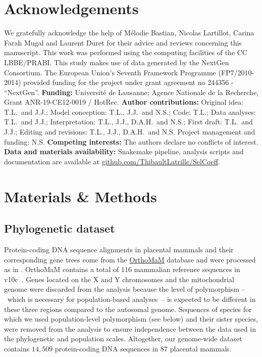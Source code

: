 \documentclass{article}
\begin{document}
    \section*{Acknowledgements}
    \label{sec:acknowledgment}
    We gratefully acknowledge the help of Mélodie Bastian, Nicolas Lartillot, Carina Farah Mugal and Laurent Duret for their advice and reviews concerning this manuscript.
    This work was performed using the computing facilities of the CC LBBE/PRABI\@.
    This study makes use of data generated by the NextGen Consortium.
    The European Union’s Seventh Framework Programme (FP7/2010-2014) provided funding for the project under grant agreement no 244356 - “NextGen”.
    \textbf{Funding:}
    Université de Lausanne; Agence Nationale de la Recherche, Grant ANR-19-CE12-0019 / HotRec.
    \textbf{Author contributions:}
    Original idea: T.L.\ and J.J.;
    Model conception: T.L., J.J.\ and N.S.;
    Code: T.L.;
    Data analyses: T.L.\ and J.J.;
    Interpretation: T.L., J.J., D.A.H.\ and N.S.;
    First draft: T.L.\ and J.J.;
    Editing and revisions: T.L., J.J., D.A.H.\ and N.S.
    Project management and funding: N.S\@.
    \textbf{Competing interests:}
    The authors declare no conflicts of interest.
    \textbf{Data and materials availability:}
    Snakemake pipeline, analysis scripts and documentation are available at \href{https://github.com/ThibaultLatrille/SelCoeff}{github.com/ThibaultLatrille/SelCoeff}.


    \section{Materials \& Methods}
    \label{sec:methods}

    \subsection{Phylogenetic dataset}

    Protein-coding DNA sequence alignments in placental mammals and their corresponding gene trees come from the \href{https://www.orthomam.univ-montp2.fr}{OrthoMaM} database and were processed as in \textcite{latrille_genes_2023}.
    OrthoMaM contains a total of $116$ mammalian reference sequences in v10c~\cite{ranwez_orthomam_2007, douzery_orthomam_2014, scornavacca_orthomam_2019}.
    Genes located on the X and Y chromosomes and the mitochondrial genome were discarded from the analysis because the level of polymorphism – which is necessary for population-based analyses – is expected to be different in these three regions compared to the autosomal genome.
    Sequences of species for which we used population-level polymorphism (see below) and their sister species, were removed from the analysis to ensure independence between the data used in the phylogenetic and population scales.
    Altogether, our genome-wide dataset contains $14,509$ protein-coding DNA sequences in $87$ placental mammals.
\end{document}
